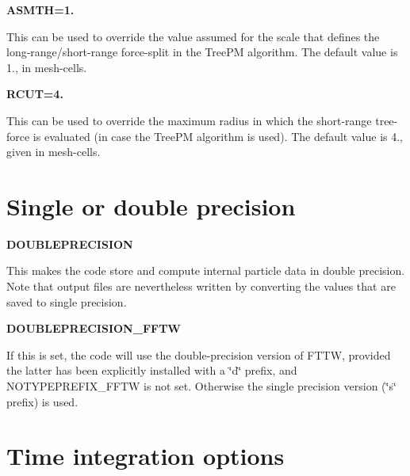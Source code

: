 \begin{DoxyItemize}
\item {\bfseries  \-A\-S\-M\-T\-H=1.} \par
 \-This can be used to override the value assumed for the scale that defines the long-\/range/short-\/range force-\/split in the \-Tree\-P\-M algorithm. \-The default value is 1., in mesh-\/cells.
\end{DoxyItemize}


\begin{DoxyItemize}
\item {\bfseries  \-R\-C\-U\-T=4.} \par
 \-This can be used to override the maximum radius in which the short-\/range tree-\/force is evaluated (in case the \-Tree\-P\-M algorithm is used). \-The default value is 4., given in mesh-\/cells.
\end{DoxyItemize}

\par
 \hypertarget{Gadget-Makefile_secmake4}{}\section{\-Single or double precision}\label{Gadget-Makefile_secmake4}

\begin{DoxyItemize}
\item {\bfseries \-D\-O\-U\-B\-L\-E\-P\-R\-E\-C\-I\-S\-I\-O\-N} \par
 \-This makes the code store and compute internal particle data in double precision. \-Note that output files are nevertheless written by converting the values that are saved to single precision.
\end{DoxyItemize}


\begin{DoxyItemize}
\item {\bfseries \-D\-O\-U\-B\-L\-E\-P\-R\-E\-C\-I\-S\-I\-O\-N\-\_\-\-F\-F\-T\-W} \par
 \-If this is set, the code will use the double-\/precision version of \-F\-T\-T\-W, provided the latter has been explicitly installed with a \char`\"{}d\char`\"{} prefix, and \-N\-O\-T\-Y\-P\-E\-P\-R\-E\-F\-I\-X\-\_\-\-F\-F\-T\-W is not set. \-Otherwise the single precision version (\char`\"{}s\char`\"{} prefix) is used.
\end{DoxyItemize}

\par
 \hypertarget{Gadget-Makefile_secmake5}{}\section{\-Time integration options}\label{Gadget-Makefile_secmake5}

